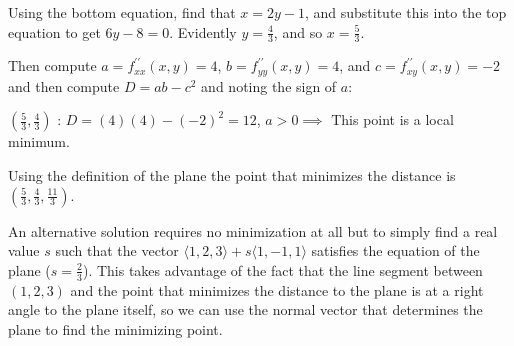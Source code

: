 \documentclass{article}
\begin{document}
Using the bottom equation, find that $x = 2y-1$, and substitute this into the top equation to get $6y-8 = 0$. Evidently $y = \frac{4}{3}$, and so $x = \frac{5}{3}$.

Then compute $a = f^{\prime \prime}_{xx}(x,y) = 4$, $b = f^{\prime \prime}_{yy}(x,y) = 4$, and $c = f^{\prime \prime}_{xy}(x,y) = -2$ and then compute $D = ab-c^2$ and noting the sign of $a$:

$(\frac{5}{3}, \frac{4}{3})$ : $D = (4)(4)-(-2)^2 = 12$, $a > 0 \implies$ This point is a local minimum.

Using the definition of the plane the point that minimizes the distance is $(\frac{5}{3}, \frac{4}{3}, \frac{11}{3})$.

An alternative solution requires no minimization at all but to simply find a real value $s$ such that the vector $\langle 1, 2 ,3 \rangle + s\langle 1, -1 ,1 \rangle$ satisfies the equation of the plane ($s = \frac{2}{3}$). This takes advantage of the fact that the line segment between $(1,2,3)$ and the point that minimizes the distance to the plane is at a right angle to the plane itself, so we can use the normal vector that determines the plane to find the minimizing point.
\end{document}
